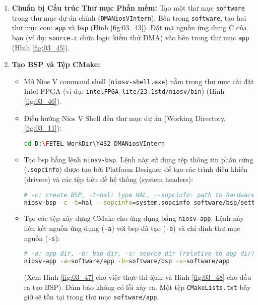 \begin{enumerate}
    \item \textbf{Chuẩn bị Cấu trúc Thư mục Phần mềm:} Tạo một thư mục \texttt{software} trong thư mục dự án chính (\texttt{DMANiosVIntern}). Bên trong \texttt{software}, tạo hai thư mục con: \texttt{app} và \texttt{bsp} (Hình \ref{fig:03_43}). Đặt mã nguồn ứng dụng C của bạn (ví dụ: \texttt{source.c} chứa logic kiểm thử DMA) vào bên trong thư mục \texttt{app} (Hình \ref{fig:03_45}).
    \item \textbf{Tạo BSP và Tệp CMake:}
    \begin{itemize}
        \item Mở Nios V command shell (\texttt{niosv-shell.exe}) nằm trong thư mục cài đặt Intel FPGA (ví dụ: \texttt{intelFPGA\_lite/23.1std/niosv/bin}) (Hình \ref{fig:03_46}).
        \item Điều hướng Nios V Shell đến thư mục dự án (Working Directory, \ref{fig:03_11}): 
        \begin{lstlisting}[language=bash, caption={Điều hướng trong Nios V Shell}, label=lst:cd_project] 
        cd D:\FETEL_WorkDir\Y4S2_DMANiosVIntern \end{lstlisting}
        \item Tạo \acrshort{bsp} bằng lệnh \texttt{niosv-bsp}. Lệnh này sử dụng tệp thông tin phần cứng (\texttt{.sopcinfo}) được tạo bởi Platform Designer để tạo các trình điều khiển (drivers) và các tệp tiêu đề hệ thống (system headers):
        \begin{lstlisting}[language=bash, caption={Lệnh tạo BSP Nios V}, label=lst:gen_bsp]
# -c: create BSP, -t=hal: type HAL, --sopcinfo: path to hardware info
niosv-bsp -c -t=hal --sopcinfo=system.sopcinfo software/bsp/settings.bsp \end{lstlisting}
        \item Tạo các tệp xây dựng CMake cho ứng dụng bằng \texttt{niosv-app}. Lệnh này liên kết nguồn ứng dụng (\texttt{-a}) với \acrshort{bsp} đã tạo (\texttt{-b}) và chỉ định thư mục nguồn (\texttt{-s}):
        \begin{lstlisting}[language=bash, caption={Lệnh tạo tệp CMake ứng dụng Nios V}, label=lst:gen_app]
# -a: app dir, -b: bsp dir, -s: source dir (relative to app dir)
niosv-app -a=software/app -b=software/bsp -s=software/app \end{lstlisting}
        (Xem Hình \ref{fig:03_47} cho việc thực thi lệnh và Hình \ref{fig:03_48} cho đầu ra tạo BSP). Đảm bảo không có lỗi xảy ra. Một tệp \texttt{CMakeLists.txt} bây giờ sẽ tồn tại trong thư mục \texttt{software/app}.

\end{itemize}
\end{enumerate}
